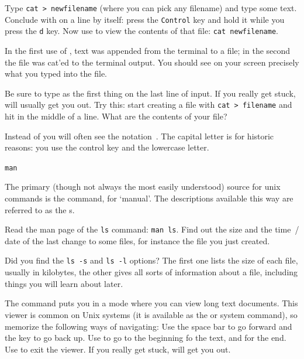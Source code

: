 \begin{exercise}
  Type \lstinline{cat > newfilename} (where you can pick any filename) and
  type some text. Conclude with  on a line by
  itself: press the \texttt{Control} key and hold it while you
  press the \texttt{d} key.  Now use  to view the
  contents of that file: \lstinline{cat newfilename}.
\end{exercise}
\begin{outcome}
  In the first use of , text was appended
  from the terminal to a file; in the second the file was cat'ed to
  the terminal output. You should see on your screen precisely what
  you typed into the file.
\end{outcome}
\begin{caution}
  Be sure to type  as the first thing on the last line of input. If you
    really get stuck,  will usually get you out. Try this:
    start creating a file with \lstinline{cat > filename} and hit  in
    the middle of a line. What are the contents of your file?
\end{caution}

\begin{remark}
  Instead of  you will often see the notation~. 
  The capital letter is for historic reasons: you use the control key
  and the lowercase letter.
\end{remark}

 {\texttt{man}}

The primary (though not always the most easily understood) source for unix commands
is the  command, for `manual'.
The descriptions available this way are referred to as the s.

\begin{exercise}
  Read the man page of the \lstinline{ls} command:
  \lstinline{man ls}.
  Find out the size and the time~/ date of the last change
  to some files, for instance the file you just created.
\end{exercise}
\begin{outcome}
  Did you find the \lstinline{ls -s} and \lstinline{ls -l} options? The first one
  lists the size of each file, usually in kilobytes, the other gives
  all sorts of information about a file, including things you will
  learn about later.
\end{outcome}

The  command
    puts you in a mode where you can view long text documents. This
    viewer is common on Unix systems (it is available as the  or
     system command), so memorize the following ways of navigating: Use
    the space bar to go forward and the  key to go back up. Use
     to go to the beginning fo the text, and  for the end. Use
     to exit the viewer. If you really get stuck,  will
    get you out.

